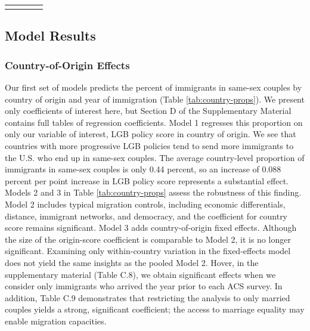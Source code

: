 \documentclass[
  12pt,
]{article}
\begin{document}
\begin{longtable}[c]{|p{0.75in}|p{1.17in}|p{1.43in}|p{1.30in}}
\noalign{\global\setlength{\arrayrulewidth}{2pt}}\arrayrulecolor[HTML]{666666}\cline{1-4}



\end{longtable}

\hypertarget{model-results}{%
\subsection{Model Results}\label{model-results}}

\hypertarget{country-of-origin-effects}{%
\subsubsection{Country-of-Origin Effects}\label{country-of-origin-effects}}

Our first set of models predicts the percent of immigrants in same-sex couples by country of origin and year of immigration (Table \ref{tab:country-props}). We present only coefficients of interest here, but Section D of the Supplementary Material contains full tables of regression coefficients. Model 1 regresses this proportion on only our variable of interest, LGB policy score in country of origin. We see that countries with more progressive LGB policies tend to send more immigrants to the U.S. who end up in same-sex couples. The average country-level proportion of immigrants in same-sex couples is only 0.44 percent, so an increase of 0.088 percent per point increase in LGB policy score represents a substantial effect. Models 2 and 3 in Table \ref{tab:country-props} assess the robustness of this finding. Model 2 includes typical migration controls, including economic differentials, distance, immigrant networks, and democracy, and the coefficient for country score remains significant. Model 3 adds country-of-origin fixed effects. Although the size of the origin-score coefficient is comparable to Model 2, it is no longer significant. Examining only within-country variation in the fixed-effects model does not yield the same insights as the pooled Model 2. Hover, in the supplementary material (Table C.8), we obtain significant effects when we consider only immigrants who arrived the year prior to each ACS survey. In addition, Table C.9 demonstrates that restricting the analysis to only married couples yields a strong, significant coefficient; the access to marriage equality may enable migration capacities.
\end{document}
